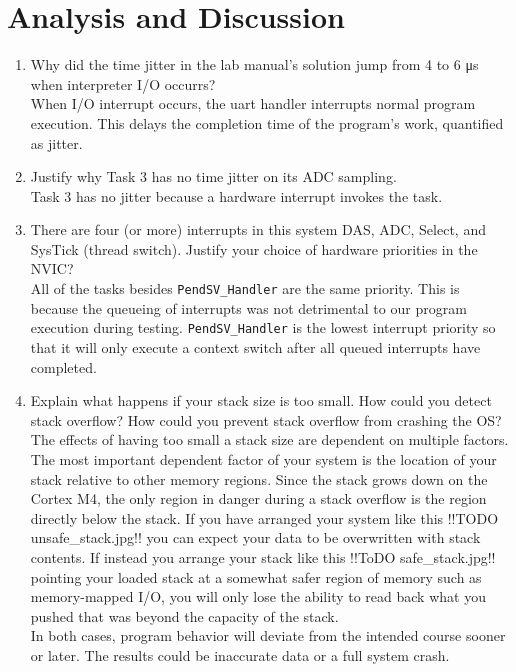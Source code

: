 \documentclass[12pt]{article}
\begin{document}
\section{Analysis and Discussion}
\begin{enumerate}[1)]
\item Why did the time jitter in the lab manual's solution jump from 4
  to 6 μs when interpreter I/O occurrs? \\
  When I/O interrupt occurs, the uart handler interrupts normal
  program execution. This delays the completion time of the program's
  work, quantified as jitter.
\item Justify why Task 3 has no time jitter on its ADC sampling. \\
  Task 3 has no jitter because a hardware interrupt invokes the task.
\item There are four (or more) interrupts in this system DAS, ADC,
  Select, and SysTick (thread switch). Justify your choice of hardware
  priorities in the NVIC? \\
  All of the tasks besides \verb|PendSV_Handler| are the same
  priority. This is because the queueing of interrupts was not
  detrimental to our program execution during
  testing. \verb|PendSV_Handler| is the lowest interrupt priority so
  that it will only execute a context switch after all queued
  interrupts have completed.
\item Explain what happens if your stack size is too small. How could
  you detect stack overflow? How could you prevent stack overflow from
  crashing the OS? \\
  The effects of having too small a stack size are dependent on
  multiple factors. The most important dependent factor of your system
  is the location of your stack relative to other memory
  regions. Since the stack grows down on the Cortex M4, the only
  region in danger during a stack overflow is the region directly
  below the stack. If you have arranged your system like this !!TODO
  unsafe\_stack.jpg!! you can expect your data to be overwritten with
  stack contents. If instead you arrange your stack like this !!ToDO
  safe\_stack.jpg!! pointing your loaded stack at a somewhat safer
  region of memory such as memory-mapped I/O, you will only lose the
  ability to read back what you pushed that was beyond the
  capacity of the stack. \\
  In both cases, program behavior will deviate from the intended
  course sooner or later. The results could be inaccurate data or a
  full system crash. \\

\end{enumerate}
\end{document}
